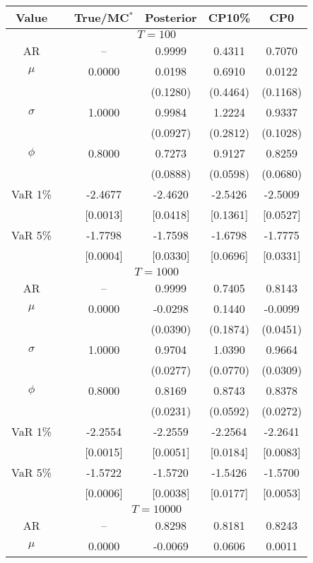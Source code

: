 { \renewcommand{\arraystretch}{1.2} 
\begin{table} 
\center 
\begin{tabular}{cc cccc} 
Value & & True/MC$^*$ & Posterior & CP10\% & CP0 \\ \hline 
\hline 
\multicolumn{6}{c}{$T =100$}  \\ 
\hline 
AR && -- & 0.9999 & 0.4311 & 0.7070  \\  
$\mu$&& 0.0000 & 0.0198 & 0.6910 & 0.0122  \\ 
&&   & (0.1280) & (0.4464) & (0.1168)  \\ 
$\sigma$&& 1.0000 & 0.9984 & 1.2224 & 0.9337  \\ 
&&   & (0.0927) & (0.2812) & (0.1028)  \\ 
$\phi$&& 0.8000 & 0.7273 & 0.9127 & 0.8259  \\ 
&&   & (0.0888) & (0.0598) & (0.0680)  \\ 
VaR 1\% && -2.4677 & -2.4620 & -2.5426 & -2.5009  \\ 
  && [0.0013] & [0.0418] & [0.1361] & [0.0527]  \\ 
VaR 5\% && -1.7798 & -1.7598 & -1.6798 & -1.7775  \\ 
 && [0.0004] & [0.0330] & [0.0696] & [0.0331]  \\ 
\hline 
\multicolumn{6}{c}{$T =1000$}  \\ 
\hline 
AR && -- & 0.9999 & 0.7405 & 0.8143  \\  
$\mu$&& 0.0000 & -0.0298 & 0.1440 & -0.0099  \\ 
&&   & (0.0390) & (0.1874) & (0.0451)  \\ 
$\sigma$&& 1.0000 & 0.9704 & 1.0390 & 0.9664  \\ 
&&   & (0.0277) & (0.0770) & (0.0309)  \\ 
$\phi$&& 0.8000 & 0.8169 & 0.8743 & 0.8378  \\ 
&&   & (0.0231) & (0.0592) & (0.0272)  \\ 
VaR 1\% && -2.2554 & -2.2559 & -2.2564 & -2.2641  \\ 
  && [0.0015] & [0.0051] & [0.0184] & [0.0083]  \\ 
VaR 5\% && -1.5722 & -1.5720 & -1.5426 & -1.5700  \\ 
 && [0.0006] & [0.0038] & [0.0177] & [0.0053]  \\ 
\hline 
\multicolumn{6}{c}{$T =10000$}  \\ 
\hline 
AR && -- & 0.8298 & 0.8181 & 0.8243  \\  
$\mu$&& 0.0000 & -0.0069 & 0.0606 & 0.0011  \\ 

\end{tabular}
\end{table}}
